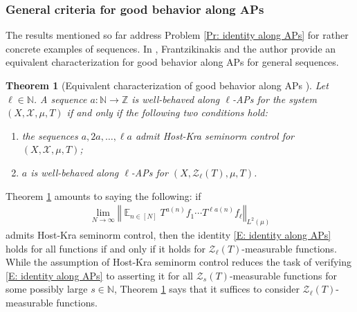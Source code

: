 \documentclass[11pt]{amsart}
\newtheorem{theorem}[lemma]{Theorem}
\theoremstyle{definition}
\DeclareMathOperator*{\E}{\mathbb{E}}
\newcommand{\N}{{\mathbb N}}
\newcommand{\Z}{{\mathbb Z}}
\newcommand{\CX}{{\mathcal X}}
\newcommand{\CZ}{{\mathcal Z}}
\newcommand{\norm}[1]{\left\Vert #1\right\Vert}
\newcommand{\1}{{\mathbf{1}}}
\begin{document}
\subsubsection{General criteria for good behavior along APs}
The results mentioned so far address Problem \ref{Pr: identity along APs} for rather concrete examples of sequences. In \cite{FrKu22c}, Frantzikinakis and the author provide an equivalent characterization for good behavior along APs for general sequences. 
\begin{theorem}[Equivalent characterization of good behavior along APs {\cite[Theorem 3.11]{FrKu22c}}]\label{T: FrKu degree lowering on APs}
    Let $\ell\in\N$. A sequence $a:\N\to\Z$ is well-behaved along $\ell$-APs for the system $(X, \CX, \mu, T)$ if and only if the following two conditions hold:
    \begin{enumerate}
        \item the sequences $a, 2a, \ldots, \ell a$ admit Host-Kra seminorm control for $(X, \CX, \mu, T)$;
        \item $a$ is well-behaved along $\ell$-APs for $(X, \CZ_\ell(T), \mu, T)$.
    \end{enumerate}
\end{theorem}
Theorem \ref{T: FrKu degree lowering on APs} amounts to saying the following: if 
\begin{align*}%
        \lim_{N\to\infty}\norm{\E_{n\in[N]}T^{a(n)}f_1\cdots T^{\ell a(n)}f_\ell}_{L^2(\mu)}
\end{align*}
admits Host-Kra seminorm control, then the identity \eqref{E: identity along APs} holds for all functions if and only if it holds for $\CZ_\ell(T)$-measurable functions. While the assumption of Host-Kra seminorm control reduces the task of verifying \eqref{E: identity along APs} to asserting it for all $\CZ_s(T)$-measurable functions for some possibly large $s\in\N$, Theorem  \ref{T: FrKu degree lowering on APs} says that it suffices to consider $\CZ_\ell(T)$-measurable functions.
\end{document}
